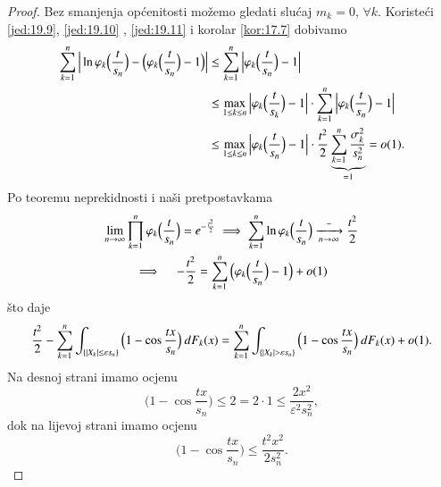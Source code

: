 \begin{proof}
    Bez smanjenja op\' cenitosti mo\v zemo gledati slu\' caj $m_k = 0$, $\forall k$.
    Koriste\' ci \eqref{jed:19.9}, \eqref{jed:19.10} , \eqref{jed:19.11} i korolar \ref{kor:17.7} dobivamo
    \begin{equation*}
        \begin{aligned}
            \sum\limits_{k = 1}^{n} \Big| \ln \varphi_k \Big( \frac{t}{s_n} \Big) - \Big( \varphi_k \Big( \frac{t}{s_n} \Big) - 1  \Big) \Big| &\leq \sum\limits_{k = 1}^{n} \Big| \varphi_k \Big( \frac{t}{s_n} \Big) - 1 \Big|\\
            &\leq \max_{1 \leq k \leq n} \Big| \varphi_k \Big( \frac{t}{s_k} \Big) - 1 \Big| \cdot \sum\limits_{k = 1}^{n} \Big| \varphi_k \Big( \frac{t}{s_n} \Big) -1 \Big|\\
            &\leq \max\limits_{1 \leq k \leq n} \Big| \varphi_k \Big( \frac{t}{s_n} \Big) - 1 \Big| \cdot \frac{t^2}{2} \underbrace{\sum\limits_{k = 1}^{n} \frac{\sigma_k^2}{s_n^2} }_{= 1} = o(1).    
        \end{aligned}
    \end{equation*}
    Po teoremu neprekidnosti i na\v si pretpostavkama
    \begin{equation*}
        \begin{gathered}
            \lim\limits_{n \to \infty} \prod\limits_{k = 1}^{n} \varphi_k \Big( \frac{t}{s_n} \Big) = e^{-\frac{t^2}{2}} \implies \sum\limits_{k = 1}^{n} \ln \varphi_k \Big( \frac{t}{s_n} \Big) \xrightarrow[n \to \infty] -\frac{t^2}{2}\\
            \implies \quad -\frac{t^2}{2} = \sum\limits_{k = 1}^{n} \Big( \varphi_k \Big( \frac{t}{s_n} \Big) -1 \Big) + o(1)
        \end{gathered}
    \end{equation*}
    \v sto daje
    \begin{equation*}
        \frac{t^2}{2} - \sum\limits_{k = 1}^{n} \int_{\{ |X_k| \leq \varepsilon s_n \}} \Big( 1 - \cos \frac{tx}{s_n} \Big) \: d F_k (x) = \sum\limits_{k = 1}^{n} \int_{\{ |X_k| > \varepsilon s_n \}} \Big( 1 - \cos \frac{tx}{s_n} \Big) \: d F_k (x) + o(1).
    \end{equation*}
    Na desnoj strani imamo ocjenu
    \begin{equation*}
        \Big( 1 - \cos \frac{tx}{s_n} \Big) \leq 2 = 2 \cdot 1 \leq  \frac{2x^2}{\varepsilon^2 s_n^2},
    \end{equation*}
    dok na lijevoj strani imamo ocjenu
    \begin{equation*}
        \Big( 1 - \cos \frac{tx}{s_n} \Big) \leq \frac{t^2 x^2}{2 s_n^2}.

\end{equation*}
\end{proof}
